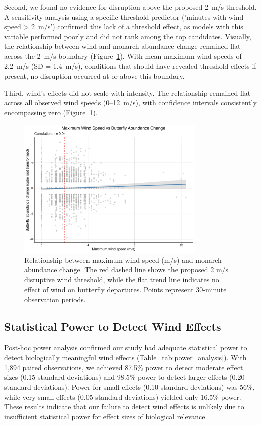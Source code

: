 Second, we found no evidence for disruption above the proposed 2~m/s threshold. A sensitivity analysis using a specific threshold predictor ('minutes with wind speed > 2~m/s') confirmed this lack of a threshold effect, as models with this variable performed poorly and did not rank among the top candidates. Visually, the relationship between wind and monarch abundance change remained flat across the 2~m/s boundary (Figure~\ref{fig:wind_scatter}). With mean maximum wind speeds of 2.2~m/s (SD = 1.4~m/s), conditions that should have revealed threshold effects if present, no disruption occurred at or above this boundary.

Third, wind's effects did not scale with intensity. The relationship remained flat across all observed wind speeds (0–12~m/s), with confidence intervals consistently encompassing zero (Figure~\ref{fig:wind_scatter}).

\begin{figure}[htbp]
\centering
\includegraphics[width=0.8\textwidth]{figures/results/wind_hypothesis_scatter.png}
\caption{Relationship between maximum wind speed (m/s) and monarch abundance change. The red dashed line shows the proposed 2 m/s disruptive wind threshold, while the flat trend line indicates no effect of wind on butterfly departures. Points represent 30-minute observation periods.}\label{fig:wind_scatter}
\end{figure}

\subsection{Statistical Power to Detect Wind Effects}

Post-hoc power analysis confirmed our study had adequate statistical power to detect biologically meaningful wind effects (Table~\ref{tab:power_analysis}). With 1,894 paired observations, we achieved 87.5\% power to detect moderate effect sizes (0.15 standard deviations) and 98.5\% power to detect larger effects (0.20 standard deviations). Power for small effects (0.10 standard deviations) was 56\%, while very small effects (0.05 standard deviations) yielded only 16.5\% power. These results indicate that our failure to detect wind effects is unlikely due to insufficient statistical power for effect sizes of biological relevance.

